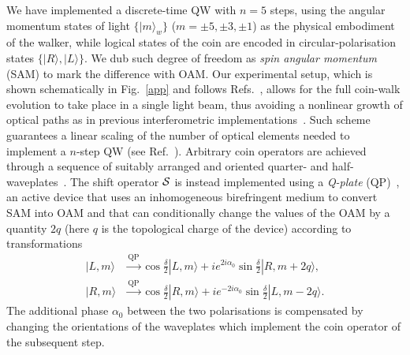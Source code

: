 We have implemented a discrete-time \ac{QW} with $n=5$ steps, using the angular momentum states of light $\{|m\rangle_w\}$ ($m=\pm 5, \pm 3, \pm 1$) as the physical embodiment of the walker, while logical states of the coin are encoded in circular-polarisation states $\{|R\rangle, |L\rangle\}$. We dub such degree of freedom as {\it spin angular momentum} (SAM) to mark the difference with OAM. Our experimental setup, which is shown schematically in Fig.~\ref{app} and follows Refs.~\cite{cardano2015quantum,cardano2016statistical}, allows for the full coin-walk evolution to take place in a single light beam, thus avoiding a nonlinear growth of optical paths as in previous interferometric implementations~\cite{zhang2010implementation,goyal2013implementing,cardano2015quantum}. Such scheme guarantees a linear scaling of the number of optical elements needed to implement a $n$-step QW (see Ref.~\cite{SI}). Arbitrary coin operators are achieved through a sequence of suitably arranged and oriented quarter- and half-waveplates~\cite{simon1990minimal}. The shift operator ${\mathcal{S}}$ is instead implemented using a \emph{Q-plate} (QP)~\cite{marrucci2006optical}, an active device that uses an inhomogeneous birefringent medium to convert SAM into OAM  and that can conditionally change the values of the OAM by a quantity $2q$ (here $q$ is the topological charge of the device) according to transformations 
\begin{equation}
\begin{aligned}
|L,m\rangle&\stackrel{\text{QP}}{\longrightarrow} \cos{ \frac{\delta}{2}}|L,m\rangle + i e^{2 i \alpha_0}\sin{\frac{\delta}{2}}|R,m+2q\rangle,\\
|R,m\rangle&\stackrel{\text{QP}}{\longrightarrow} \cos{ \frac{\delta}{2}}|R,m\rangle + i e^{-2 i \alpha_0}\sin{\frac{\delta}{2}}|L,m-2q\rangle.
\end{aligned}
\end{equation}
The additional phase $\alpha_0$ between the two polarisations is compensated by changing the orientations of the waveplates which implement the coin operator of the subsequent step.

